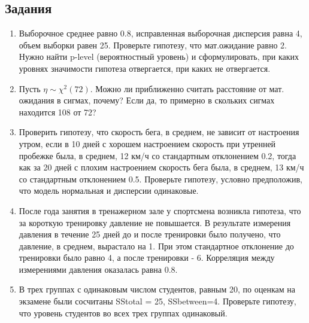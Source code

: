 \documentclass[12 pt]{article}
\begin{document}
\subsection*{Задания}
\begin{enumerate}
\item
Выборочное среднее равно 0.8, исправленная выборочная дисперсия равна 4, объем выборки равен 25. Проверьте гипотезу, что
мат.ожидание равно 2. Нужно найти p-level (вероятностный уровень) и сформулировать, при каких уровнях значимости
гипотеза отвергается, при каких не отвергается.
\item
Пусть $\eta\sim \chi^2(72)$. Можно ли приближенно считать расстояние от мат. ожидания в сигмах, почему?
Если да, то примерно в скольких сигмах находится 108 от 72?
\item
Проверить гипотезу, что скорость бега, в среднем, не зависит от настроения утром, если
в 10 дней с хорошем настроением скорость при утренней пробежке была, в среднем, 12 км/ч со стандартным отклонением 0.2,
тогда как за 20 дней с плохим настроением скорость бега была, в среднем, 13 км/ч со стандартным отклонением 0.5.
Проверьте гипотезу, условно предположив, что модель нормальная и дисперсии одинаковые.
\item
После года занятия в тренажерном зале у спортсмена возникла гипотеза, что за короткую тренировку давление не повышается.
В результате измерения давления в течение 25 дней до и после тренировки было получено, что давление, в среднем, вырастало на 1.
При этом стандартное отклонение до тренировки было равно 4, а после тренировки - 6. Корреляция между измерениями давления
оказалась равна 0.8.
\item
В трех группах с одинаковым числом студентов, равным 20,
по оценкам на экзамене были сосчитаны SStotal = 25, SSbetween=4. Проверьте гипотезу, что уровень студентов
во всех трех группах одинаковый.
\end{enumerate}
\end{document}
